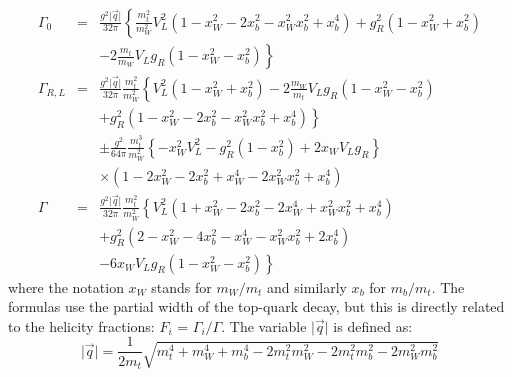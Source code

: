 \begin{eqnarray}
  \Gamma_{0}   & = & \frac{g^{2} \vert \vec{q} \vert}{32 \pi} \left\lbrace \frac{m_{t}^{2}}{m_{W}^{2}} V_{L}^{2} (1 - x_{W}^{2} - 2x_{b}^{2} -x_{W}^{2} x_{b}^{2} + x_{b}^{4}) + g_{R}^{2} (1 - x_{W}^{2} + x_{b}^{2}) \right. \nonumber \\
               &   & \left. - 2 \frac{m_{t}}{m_{W}} V_{L}g_{R} (1- x_{W}^{2} - x_{b}^{2}) \right\rbrace  \label{eq::Width0}\\
  \Gamma_{R,L} & = & \frac{g^{2} \vert \vec{q} \vert}{32 \pi} \frac{m_{t}^{2}}{m_{W}^{2}} \left\lbrace V_{L}^{2} (1 - x_{W}^{2} + x_{b}^{2}) - 2 \frac{m_W}{m_t} V_{L}g_{R} (1- x_{W}^{2} - x_{b}^{2}) \right. \nonumber \\
               &   & \left. + g_{R}^{2} (1 - x_{W}^{2} - 2x_{b}^{2} -x_{W}^{2} x_{b}^{2} + x_{b}^{4}) \right\rbrace \nonumber \\
               &   & \pm \frac{g^{2}}{64 \pi} \frac{m_{t}^{3}}{m_{W}^{2}} \left\lbrace -x_{W}^{2} V_{L}^{2} - g_{R}^{2} (1-x_{b}^{2}) + 2 x_{W} V_{L}g_{R} \right\rbrace \nonumber \\
               &   & \times (1-2x_{W}^{2} - 2x_{b}^{2} + x_{W}^{4} - 2x_{W}^{2} x_{b}^{2} + x_{b}^{4}) \label{eq::WidthRL} \\
  \Gamma       & = & \frac{g^{2} \vert \vec{q} \vert}{32 \pi} \frac{m_{t}^{2}}{m_{W}^{2}} \left\lbrace V_{L}^{2} (1 + x_{W}^{2} - 2x_{b}^{2} - 2 x_{W}^{4} + x_{W}^{2} x_{b}^{2} + x_{b}^{4}) \right. \nonumber \\
               &   & + g_{R}^{2} \left( 2 - x_{W}^{2} - 4 x_{b}^{2} - x_{W}^{4} - x_{W}^{2} x_{b}^{2} + 2 x_{b}^{4} \right) \nonumber \\
               &   & \left. - 6 x_{W} V_{L}g_{R} (1 - x_{W}^{2} - x_{b}^{2}) \right\rbrace \label{eq::WidthTot}
\end{eqnarray}
where the notation $x_W$ stands for $m_W/m_t$ and similarly $x_b$ for $m_b/m_t$.
The formulas use the partial width of the top-quark decay, but this is directly related to the helicity fractions: $F_i$ = $\Gamma_{i}/\Gamma$.
The variable $\vert \vec{q} \vert$ is defined as:
\begin{equation}
 \vert \vec{q} \vert = \frac{1}{2 m_{t}} \sqrt{m_{t}^{4} + m_{W}^{4} + m_{b}^{4} - 2m_{t}^{2} m_{W}^{2} - 2m_{t}^{2} m_{b}^{2} - 2m_{W}^{2}m_{b}^{2}}
\end{equation}

